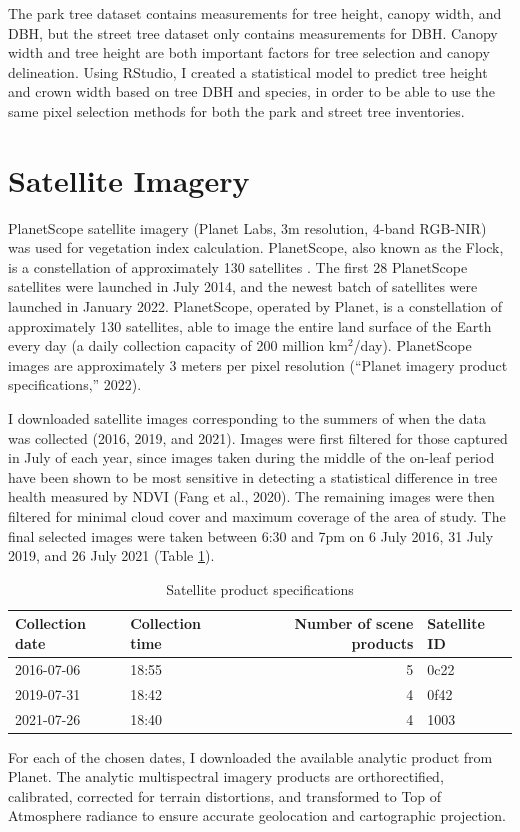 \documentclass[12pt,twoside]{reedthesis}
\begin{document}
The park tree dataset contains measurements for tree height, canopy width, and DBH, but the street tree dataset only contains measurements for DBH. Canopy width and tree height are both important factors for tree selection and canopy delineation. Using RStudio, I created a statistical model to predict tree height and crown width based on tree DBH and species, in order to be able to use the same pixel selection methods for both the park and street tree inventories.

\hypertarget{satellite-imagery}{%
\section{Satellite Imagery}\label{satellite-imagery}}

PlanetScope satellite imagery (Planet Labs, 3m resolution, 4-band RGB-NIR) was used for vegetation index calculation. PlanetScope, also known as the Flock, is a constellation of approximately 130 satellites . The first 28 PlanetScope satellites were launched in July 2014, and the newest batch of satellites were launched in January 2022. PlanetScope, operated by Planet, is a constellation of approximately 130 satellites, able to image the entire land surface of the Earth every day (a daily collection capacity of 200 million km\(^2\)/day). PlanetScope images are approximately 3 meters per pixel resolution ({``Planet imagery product specifications,''} 2022).

I downloaded satellite images corresponding to the summers of when the data was collected (2016, 2019, and 2021). Images were first filtered for those captured in July of each year, since images taken during the middle of the on-leaf period have been shown to be most sensitive in detecting a statistical difference in tree health measured by NDVI (Fang et al., 2020). The remaining images were then filtered for minimal cloud cover and maximum coverage of the area of study. The final selected images were taken between 6:30 and 7pm on 6 July 2016, 31 July 2019, and 26 July 2021 (Table \ref{tab:sat-products}).
\begin{longtable}[t]{llrl}
\caption{\label{tab:sat-products}Satellite product specifications}\\
\toprule
Collection date & Collection time & Number of scene products & Satellite ID\\
\midrule
2016-07-06 & 18:55 & 5 & 0c22\\
2019-07-31 & 18:42 & 4 & 0f42\\
2021-07-26 & 18:40 & 4 & 1003\\
\bottomrule
\end{longtable}
For each of the chosen dates, I downloaded the available analytic product from Planet. The analytic multispectral imagery products are orthorectified, calibrated, corrected for terrain distortions, and transformed to Top of Atmosphere radiance to ensure accurate geolocation and cartographic projection.
\end{document}
